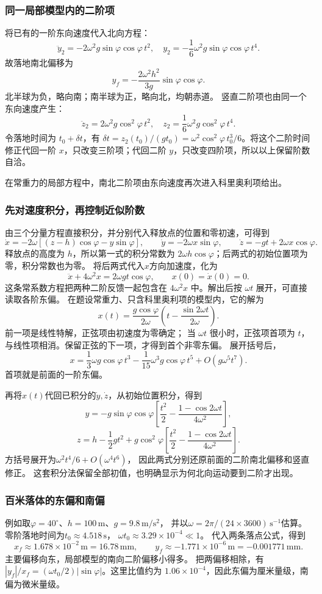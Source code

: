 \documentclass[UTF8,fontset=fandol,a4paper,11pt]{ctexart}
\begin{document}
\subsubsection*{同一局部模型内的二阶项}
将已有的一阶东向速度代入北向方程：
\[
\ddot y_2=-2\omega^2g\sin\varphi\cos\varphi\,t^2,
\quad y_2=-\frac16\omega^2g\sin\varphi\cos\varphi\,t^4.
\]
故落地南北偏移为
\[
\boxed{y_f=-\frac{2\omega^2h^2}{3g}\sin\varphi\cos\varphi}.
\]
北半球为负，略向南；南半球为正，略向北，均朝赤道。
竖直二阶项也由同一个东向速度产生：
\[
\ddot z_2=2\omega^2g\cos^2\varphi\,t^2,
\quad z_2=\frac16\omega^2g\cos^2\varphi\,t^4.
\]
令落地时间为 $t_0+\delta t$，有 $\delta t=z_2(t_0)/(gt_0)=\omega^2\cos^2\varphi\,t_0^3/6$。将这个二阶时间修正代回一阶 $x$，只改变三阶项；代回二阶 $y$，只改变四阶项，所以以上保留阶数自洽。

在常重力的局部方程中，南北二阶项由东向速度再次进入科里奥利项给出。
\subsubsection*{先对速度积分，再控制近似阶数}
由三个分量方程直接积分，并分别代入释放点的位置和零初速，可得到
\[
\dot x=-2\omega[(z-h)\cos\varphi-y\sin\varphi],\qquad
\dot y=-2\omega x\sin\varphi,\qquad
\dot z=-gt+2\omega x\cos\varphi.
\]
释放点的高度为 $h$，所以第一式的积分常数为 $2\omega h\cos\varphi$；后两式的初始位置项为零，积分常数也为零。
将后两式代入$x$方向加速度，化为
\[
\ddot x+4\omega^2x=2\omega gt\cos\varphi,\qquad
x(0)=\dot x(0)=0.
\]
这条常系数方程把两种二阶反馈一起包含在 $4\omega^2x$ 中。解出后按 $\omega t$ 展开，可直接读取各阶东偏。
在题设常重力、只含科里奥利项的模型内，它的解为
\[
x(t)=\frac{g\cos\varphi}{2\omega}
\left(t-\frac{\sin2\omega t}{2\omega}\right).
\]
前一项是线性特解，正弦项由初速度为零确定；
当 $\omega t$ 很小时，正弦项首项为 $t$，与线性项相消。保留正弦的下一项，才得到首个非零东偏。
展开括号后，
\[
x=\frac13\omega g\cos\varphi\,t^3
-\frac1{15}\omega^3g\cos\varphi\,t^5+O(g\omega^5t^7).
\]
首项就是前面的一阶东偏。

再将$x(t)$代回已积分的$\dot y,\dot z$，从初始位置积分，得到
\[
y=-g\sin\varphi\cos\varphi
\left[\frac{t^2}{2}-\frac{1-\cos2\omega t}{4\omega^2}\right],
\]
\[
z=h-\frac12gt^2+
g\cos^2\varphi
\left[\frac{t^2}{2}-\frac{1-\cos2\omega t}{4\omega^2}\right].
\]
方括号展开为$\omega^2t^4/6+O(\omega^4t^6)$，
因此两式分别还原前面的二阶南北偏移和竖直修正。
这套积分法保留全部初值，也明确显示为何北向运动要到二阶才出现。

\subsubsection*{百米落体的东偏和南偏}
例如取$\varphi=40^\circ$、$h=100\,\mathrm m$、$g=9.8\,\mathrm{m/s^2}$，
并以$\omega=2\pi/(24\times3600)\,\mathrm{s^{-1}}$估算。
零阶落地时间为$t_0\approx4.518\,\mathrm s$，
$\omega t_0\approx3.29\times10^{-4}\ll1$。
代入两条落点公式，得到
\[
x_f\approx1.678\times10^{-2}\,\mathrm m=16.78\,\mathrm{mm},
\qquad
y_f\approx-1.771\times10^{-6}\,\mathrm m=-0.001771\,\mathrm{mm}.
\]
主要偏移向东，局部模型的南向二阶偏移小得多。
把两偏移相除，有 $|y_f|/x_f=(\omega t_0/2)|\sin\varphi|$。这里比值约为 $1.06\times10^{-4}$，因此东偏为厘米量级，南偏为微米量级。
\end{document}
